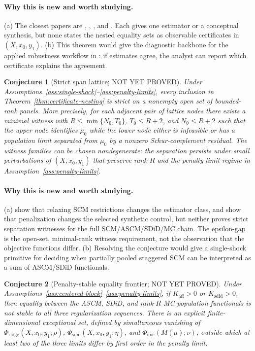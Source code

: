 \documentclass[11pt]{article}
\theoremstyle{definition}
\theoremstyle{plain}
\newtheorem{conjecture}{Conjecture}
\theoremstyle{remark}
\begin{document}
\paragraph{Why this is new and worth studying.}
(a) The closest papers are \citet{DoudchenkoImbens2016},
\citet{BenMichaelFellerRothstein2021}, \citet{ArkhangelskyAtheyHirshbergImbensWager2021},
and \citet{AtheyBayatiDoudchenkoImbensKhosravi2021}. Each gives one estimator
or a conceptual synthesis, but none states the nested equality sets as
observable certificates in $(X,x_0,y_1)$. (b) This theorem would give the
diagnostic backbone for the applied robustness workflow in
\citet{DoudchenkoImbens2016}: if estimates agree, the analyst can report which
certificate explains the agreement.

\begin{conjecture}[Strict span lattice; NOT YET PROVED]\label{conj:strict-lattice}
Under Assumptions~\ref{ass:single-shock}--\ref{ass:penalty-limits}, every
inclusion in Theorem~\ref{thm:certificate-nesting} is strict on a nonempty open
set of bounded-rank panels. More precisely, for each adjacent pair of lattice
nodes there exists a minimal witness with
$R\le \min\{N_0,T_0\}$, $T_0\le R+2$, and $N_0\le R+2$ such that the upper node
identifies $\mu_0$ while the lower node either is infeasible or has a population
limit separated from $\mu_0$ by a nonzero Schur-complement residual. The witness
families can be chosen nondegenerate: the separation persists under small
perturbations of $(X,x_0,y_1)$ that preserve rank $R$ and the penalty-limit
regime in Assumption~\ref{ass:penalty-limits}.
\end{conjecture}

\paragraph{Why this is new and worth studying.}
(a) \citet{DoudchenkoImbens2016} show that relaxing SCM restrictions changes
the estimator class, and \citet{AbadieLHour2021} show that penalization changes
the selected synthetic control, but neither proves strict separation witnesses
for the full SCM/ASCM/SDiD/MC chain. The epsilon-gap is the open-set,
minimal-rank witness requirement, not the observation that the objective
functions differ. (b) Resolving the conjecture would give
\citet{BenMichaelFellerRothstein2022} a single-shock primitive for deciding
when partially pooled staggered SCM can be interpreted as a sum of ASCM/SDiD
functionals.

\begin{conjecture}[Penalty-stable equality frontier; NOT YET PROVED]\label{conj:penalty-frontier}
Under Assumptions~\ref{ass:centered-block}--\ref{ass:penalty-limits}, if
$K_{\mathrm{aff}}>0$ or $K_{\mathrm{sdid}}>0$, then equality between the ASCM,
SDiD, and rank-$R$ MC population functionals is not stable to all three
regularization sequences. There is an explicit finite-dimensional exceptional
set, defined by simultaneous vanishing of
$\Phi_{\mathrm{ridge}}(X,x_0,y_1;\rho)$,
$\Phi_{\mathrm{sdid}}(X,x_0,y_1;\eta)$, and
$\Phi_{\mathrm{nuc}}(M(\mu);\nu)$, outside which at least two of the three
limits differ by first order in the penalty limit.
\end{conjecture}
\end{document}

